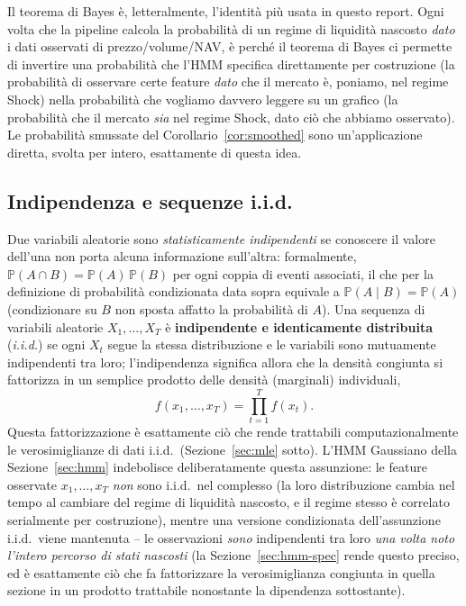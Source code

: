 \documentclass[11pt]{article}
\theoremstyle{definition}
\theoremstyle{remark}
\begin{document}
Il teorema di Bayes \`e, letteralmente, l'identit\`a pi\`u usata in questo report. Ogni volta che la pipeline calcola la probabilit\`a di un regime di liquidit\`a nascosto \emph{dato} i dati osservati di prezzo/volume/NAV, \`e perch\'e il teorema di Bayes ci permette di invertire una probabilit\`a che l'HMM specifica direttamente per costruzione (la probabilit\`a di osservare certe feature \emph{dato} che il mercato \`e, poniamo, nel regime Shock) nella probabilit\`a che vogliamo davvero leggere su un grafico (la probabilit\`a che il mercato \emph{sia} nel regime Shock, dato ci\`o che abbiamo osservato). Le probabilit\`a smussate del Corollario~\ref{cor:smoothed} sono un'applicazione diretta, svolta per intero, esattamente di questa idea.

\subsection{Indipendenza e sequenze i.i.d.}

Due variabili aleatorie sono \emph{statisticamente indipendenti} se conoscere il valore dell'una non porta alcuna informazione sull'altra: formalmente, $\mathbb{P}(A\cap B)=\mathbb{P}(A)\,\mathbb{P}(B)$ per ogni coppia di eventi associati, il che per la definizione di probabilit\`a condizionata data sopra equivale a $\mathbb{P}(A\mid B)=\mathbb{P}(A)$ (condizionare su $B$ non sposta affatto la probabilit\`a di $A$). Una sequenza di variabili aleatorie $X_1,\dots,X_T$ \`e \textbf{indipendente e identicamente distribuita} (\emph{i.i.d.}) se ogni $X_t$ segue la stessa distribuzione e le variabili sono mutuamente indipendenti tra loro; l'indipendenza significa allora che la densit\`a congiunta si fattorizza in un semplice prodotto delle densit\`a (marginali) individuali,
\[
f(x_1,\dots,x_T) = \prod_{t=1}^{T}f(x_t).
\]
Questa fattorizzazione \`e esattamente ci\`o che rende trattabili computazionalmente le verosimiglianze di dati i.i.d.\ (Sezione~\ref{sec:mle} sotto). L'HMM Gaussiano della Sezione~\ref{sec:hmm} indebolisce deliberatamente questa assunzione: le feature osservate $x_1,\dots,x_T$ \emph{non} sono i.i.d.\ nel complesso (la loro distribuzione cambia nel tempo al cambiare del regime di liquidit\`a nascosto, e il regime stesso \`e correlato serialmente per costruzione), mentre una versione condizionata dell'assunzione i.i.d.\ viene mantenuta -- le osservazioni \emph{sono} indipendenti tra loro \emph{una volta noto l'intero percorso di stati nascosti} (la Sezione~\ref{sec:hmm-spec} rende questo preciso, ed \`e esattamente ci\`o che fa fattorizzare la verosimiglianza congiunta in quella sezione in un prodotto trattabile nonostante la dipendenza sottostante).
\end{document}
